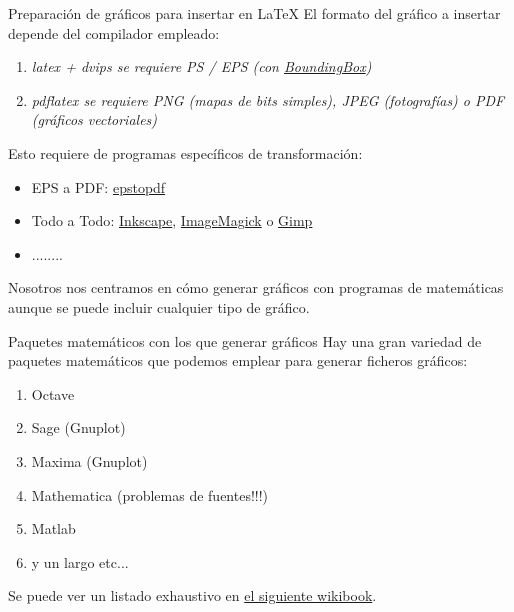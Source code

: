 \documentclass{beamer}
\begin{document}
\begin{frame}{Preparaci\'on de gr\'aficos para insertar en \LaTeX}
El formato del gr\'afico a insertar depende del compilador empleado:
\begin{enumerate}
\item \it{latex + dvips}  se requiere PS / EPS {\scriptsize(con \href{http://tex.stackexchange.com/questions/133786/no-boundingbox-error-message}{BoundingBox})}
\item \it {pdflatex} se requiere PNG {\scriptsize(mapas de bits simples)}, JPEG {\scriptsize(fotograf\'ias)} o PDF {\scriptsize(gr\'aficos vectoriales)}
\end{enumerate}

\vspace{0.5cm}
Esto requiere de programas espec\'ificos de transformaci\'on:
\begin{itemize}
\item {\sc EPS a PDF}: \href{http://tug.org/epstopdf/}{epstopdf}
\item {\sc Todo a Todo}: \href{http://www.inkscape.org/es/}{Inkscape}, 
\href{http://www.imagemagick.org}{ImageMagick} o \href{http://www.gimp.org/}{Gimp}
\item ........
\end{itemize}
Nosotros nos centramos en c\'omo generar gr\'aficos con programas de matem\'aticas aunque se puede incluir 
cualquier tipo de gr\'afico.
\end{frame}


\begin{frame}{Paquetes matem\'aticos con los que generar gr\'aficos}
Hay una gran variedad de  paquetes matem\'aticos que podemos emplear para generar ficheros 
gr\'aficos:
\begin{enumerate}
\item Octave
\item Sage  (Gnuplot)
\item Maxima (Gnuplot)
\item Mathematica {\small (problemas de fuentes!!!)}
\item Matlab
\item y un largo etc...
\end{enumerate}

Se puede ver un listado exhaustivo en \href{https://en.wikibooks.org/wiki/LaTeX/Importing_Graphics\#Third-party_graphics_tools}{el siguiente wikibook}.

\end{frame}
\end{document}
